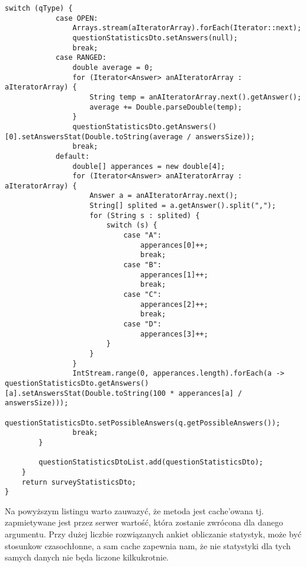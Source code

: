 \begin{lstlisting}[caption={Listing kodu pobierającego statystyki dla danej ankiety.},captionpos=b]
		switch (qType) {
			case OPEN:
				Arrays.stream(aIteratorArray).forEach(Iterator::next);
				questionStatisticsDto.setAnswers(null);
				break;
			case RANGED:
				double average = 0;
				for (Iterator<Answer> anAIteratorArray : aIteratorArray) {
					String temp = anAIteratorArray.next().getAnswer();
					average += Double.parseDouble(temp);
				}
				questionStatisticsDto.getAnswers()[0].setAnswersStat(Double.toString(average / answersSize));
				break;
			default:
				double[] apperances = new double[4];
				for (Iterator<Answer> anAIteratorArray : aIteratorArray) {
					Answer a = anAIteratorArray.next();
					String[] splited = a.getAnswer().split(",");
					for (String s : splited) {
						switch (s) {
							case "A":
								apperances[0]++;
								break;
							case "B":
								apperances[1]++;
								break;
							case "C":
								apperances[2]++;
								break;
							case "D":
								apperances[3]++;
		           		}
					}
				}
				IntStream.range(0, apperances.length).forEach(a -> questionStatisticsDto.getAnswers()[a].setAnswersStat(Double.toString(100 * apperances[a] / answersSize)));
				questionStatisticsDto.setPossibleAnswers(q.getPossibleAnswers());
				break;
		}
            
		questionStatisticsDtoList.add(questionStatisticsDto);
	}
	return surveyStatisticsDto;
}
\end{lstlisting}
Na powyższym listingu warto zauwazyć, że metoda jest cache'owana tj. zapmietywane jest przez serwer wartość, która zostanie zwrócona dla danego argumentu. Przy dużej liczbie rozwiązanych ankiet obliczanie statystyk, może być stosunkow czasochłonne, a sam cache zapewnia nam, że nie statystyki dla tych samych danych nie będa liczone kilkukrotnie.
